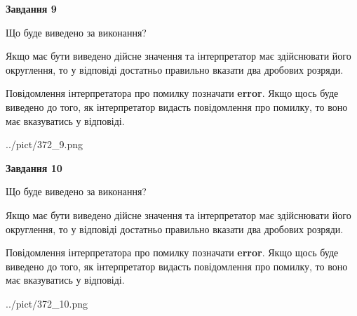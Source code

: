 \documentclass[12pt, ukrainian]{article}
\begin{document}
{\begin {Large}
{\begin {center}\textbf{Завдання 9}\end {center}}\par
Що буде виведено за виконання? \par

Якщо має бути виведено дійсне значення та інтерпретатор має здійснювати його округлення, 
то у відповіді достатньо правильно вказати два дробових розряди.

Повідомлення інтерпретатора про помилку позначати \textbf{error}.
Якщо щось буде виведено до того, як інтерпретатор видасть повідомлення про помилку, 
то воно має вказуватись у відповіді. \par

\begin{center}
	{../pict/372_9.png}
\end{center}
\newpage

{\begin {center}\textbf{Завдання 10}\end {center}}\par
Що буде виведено за виконання? \par

Якщо має бути виведено дійсне значення та інтерпретатор має здійснювати його округлення, 
то у відповіді достатньо правильно вказати два дробових розряди.

Повідомлення інтерпретатора про помилку позначати \textbf{error}.
Якщо щось буде виведено до того, як інтерпретатор видасть повідомлення про помилку, 
то воно має вказуватись у відповіді. \par

\begin{center}
	{../pict/372_10.png}
\end{center}
\newpage

\end {Large}}
\end{document}
